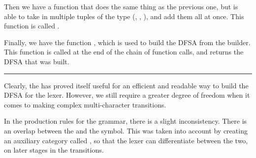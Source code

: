 \begin{figure}[H]
    \begin{subfigure}[t]{0.5\textwidth}
        \centering
    \end{subfigure}
    \begin{subfigure}[t]{0.5\textwidth}
        \centering
    \end{subfigure}
\end{figure}

Then we have a function that does the same thing as the previous one, but is
able to take in multiple tuples of the type (, ,
), and add them all at once. This function is called
.

Finally, we have the function , which is used to build the DFSA from the builder. This function is called at the end of the chain of function calls, and returns the DFSA that was built.

\begin{center}
    \rule{0.5\textwidth}{0.4pt}
\end{center}

Clearly, the  has proved itself useful for an efficient and
readable way to build the DFSA for the lexer. However, we still require a
greater degree of freedom when it comes to making complex multi-character
transitions.

\begin{warningbox}{}
    In the production rules for the  grammar, there is a slight
    inconsistency. There is an overlap between the  and the
     symbol. This was taken into account by creating an auxiliary
    category called , so that the lexer can differentiate
    between the two, on later stages in the transitions.
\end{warningbox}

